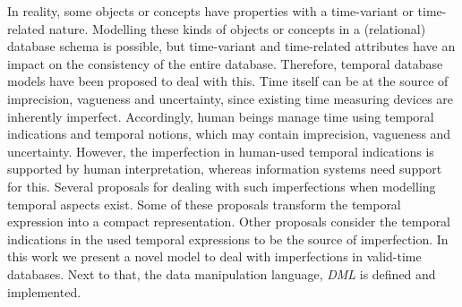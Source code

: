 %
%
In reality, some objects or concepts have properties with a time-variant or time-related nature. Modelling these kinds of objects or concepts in a (relational) database schema is possible, but time-variant and time-related attributes have an impact on the consistency of the entire database. Therefore, temporal database models have been proposed to deal with this. Time itself can be at the source of imprecision, vagueness and uncertainty, since existing time measuring devices are inherently imperfect. Accordingly, human beings manage time using temporal indications and temporal notions, which may contain imprecision, vagueness and uncertainty. However, the imperfection in human-used temporal indications is supported by human interpretation, whereas information systems need support for this. Several proposals for dealing with such imperfections when modelling temporal aspects exist. Some of these proposals transform the temporal expression into a compact representation. Other proposals consider the temporal indications in the used temporal expressions to be the source of imperfection. 
In this work we present a novel model to deal with imperfections in valid-time databases. Next to that, the data manipulation language, \emph{DML} is defined and implemented.